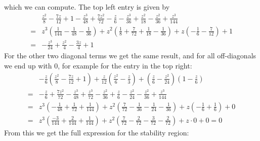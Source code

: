 \documentclass[10pt,a4paper]{article}
\begin{document}
which we can compute.
The top left entry is given by
\begin{align*}
  &\frac{z^2}{8} - \frac{7z}{12}+1 - \frac{z^3}{48} + \frac{7z^2}{72} - \frac{z}{6} - \frac{z^3}{36} + \frac{z^2}{18} - \frac{z^2}{36} + \frac{z^3}{144} \\
  =& z^3\left(\frac{1}{144} - \frac{1}{48} - \frac{1}{36}\right) + z^2\left(\frac{1}{8} + \frac{7}{72} + \frac{1}{18} - \frac{1}{36}\right) + z \left(-\frac{1}{6} - \frac{7}{12}\right) + 1 \\
  =& -\frac{z^3}{24} + \frac{z^2}{4} - \frac{3z}{4} + 1
\end{align*}
For the other two diagonal terms we get the same result, and for all off-diagonals we end up with 0, for example for the entry in the top right:
\begin{align*}
  &-\frac{z}{6}\left(\frac{z^2}{8}-\frac{7z}{12} + 1\right) + \frac{z}{12}\left(\frac{z^2}{6} - \frac{z}{3}\right) + \left(\frac{z}{6} - \frac{z^2}{24}\right)\left(1 - \frac{z}{6}\right) \\
  =& -\frac{z}{6} + \frac{7z^2}{72} - \frac{z^3}{48} + \frac{z^3}{72} - \frac{z^2}{36} + \frac{z}{6} - \frac{z^2}{24} - \frac{z^2}{36} + \frac{z^3}{144} \\
  =& z^3\left(-\frac{1}{48} + \frac{1}{72} + \frac{1}{144}\right) + z^2\left(\frac{7}{72} - \frac{1}{36} - \frac{1}{24} - \frac{1}{36}\right) + z\left(-\frac{1}{6} + \frac{1}{6}\right) + 0 \\
  =& z^3\left(\frac{-3}{144} + \frac{2}{144} + \frac{1}{144}\right) + z^2\left(\frac{7}{72} - \frac{2}{72} - \frac{3}{72} - \frac{2}{72}\right) + z\cdot 0 + 0 = 0
\end{align*}
From this we get the full expression for the stability region:
\end{document}
